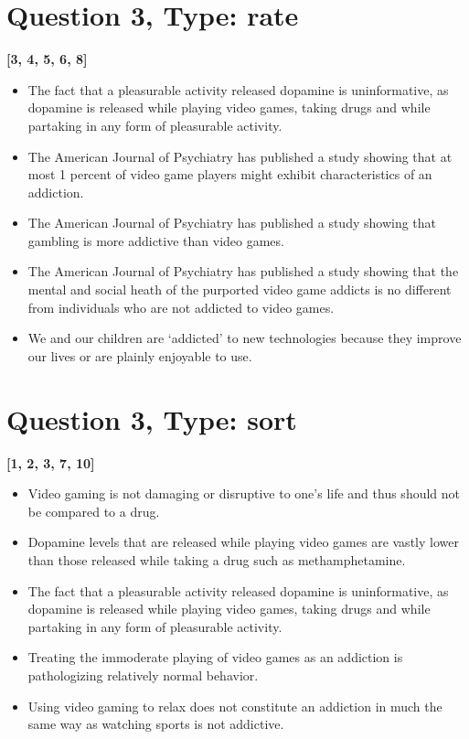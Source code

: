 \documentclass[10pt]{article}
\begin{document}
\section{Question 3, Type: rate}
\textbf{[3, 4, 5, 6, 8]}
\begin{itemize}
\item The fact that a pleasurable activity released dopamine is uninformative, as dopamine is released while playing video games, taking drugs and while partaking in any form of pleasurable activity.
\item The American Journal of Psychiatry has published a study showing that at most 1 percent of video game players might exhibit characteristics of an addiction.
\item The American Journal of Psychiatry has published a study showing that gambling is more addictive than video games.
\item The American Journal of Psychiatry has published a study showing that the mental and social heath of the purported video game addicts is no different from individuals who are not addicted to video games.
\item We and our children are `addicted' to new technologies because they improve our lives or are plainly enjoyable to use.
\end{itemize}

\section{Question 3, Type: sort}
\textbf{[1, 2, 3, 7, 10]}
\begin{itemize}
\item Video gaming is not damaging or disruptive to one's life and thus should not be compared to a drug.
\item Dopamine levels that are released while playing video games are vastly lower than those released while taking a drug such as methamphetamine.
\item The fact that a pleasurable activity released dopamine is uninformative, as dopamine is released while playing video games, taking drugs and while partaking in any form of pleasurable activity.
\item Treating the immoderate playing of video games as an addiction is pathologizing relatively normal behavior.
\item Using video gaming to relax does not constitute an addiction in much the same way as watching sports is not addictive.
\end{itemize}
\end{document}
